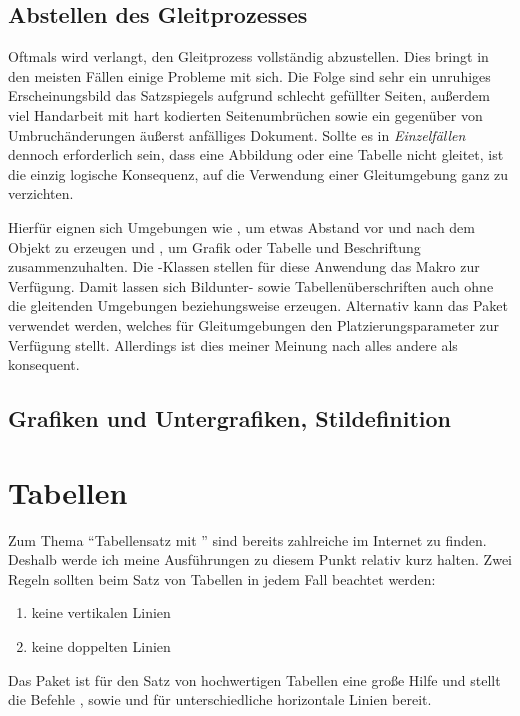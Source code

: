 \documentclass[%
  english,ngerman,%
  geometry=no,DIV=12,automark,%
]{tudscrartcl}
\begin{document}
\subsection{Abstellen des Gleitprozesses}
Oftmals wird verlangt, den Gleitprozess vollständig abzustellen. Dies bringt in 
den meisten Fällen einige Probleme mit sich. Die Folge sind sehr ein unruhiges 
Erscheinungsbild das Satzspiegels aufgrund schlecht gefüllter Seiten, außerdem 
viel Handarbeit mit hart kodierten Seitenumbrüchen sowie ein gegenüber von 
Umbruchänderungen äußerst anfälliges Dokument. Sollte es in \emph{Einzelfällen} 
dennoch erforderlich sein, dass eine Abbildung oder eine Tabelle nicht gleitet, 
ist die einzig logische Konsequenz, auf die Verwendung einer Gleitumgebung ganz 
zu verzichten. 

Hierfür eignen sich Umgebungen wie , um etwas Abstand vor 
und nach dem Objekt zu erzeugen und , um Grafik oder 
Tabelle und Beschriftung zusammenzuhalten. Die \KOMAScript-Klassen stellen für 
diese Anwendung das Makro  zur Verfügung. Damit lassen sich 
Bildunter- sowie Tabellenüberschriften auch ohne die gleitenden Umgebungen 
 beziehungsweise  erzeugen. Alternativ 
kann das Paket  verwendet werden, welches für Gleitumgebungen 
den Platzierungsparameter  zur Verfügung stellt. Allerdings ist 
dies meiner Meinung nach alles andere als konsequent.


\subsection{Grafiken und Untergrafiken, Stildefinition}
\label{sec:graphics}



\section{Tabellen}
\label{sec:tables}
Zum Thema \enquote{Tabellensatz mit } sind bereits zahlreiche 
 im 
Internet zu finden. Deshalb werde ich meine Ausführungen zu diesem Punkt 
relativ kurz halten. Zwei Regeln sollten beim Satz von Tabellen in jedem Fall 
beachtet werden:
%
\begin{enumerate}[itemindent=0pt,labelwidth=*,labelsep=1em,label=\Roman*.]
\item keine vertikalen Linien
\item keine doppelten Linien
\end{enumerate}
%
Das Paket  ist für den Satz von hochwertigen Tabellen eine 
große Hilfe und stellt die Befehle ,  sowie
 und  für unterschiedliche horizontale Linien 
bereit.
\end{document}
